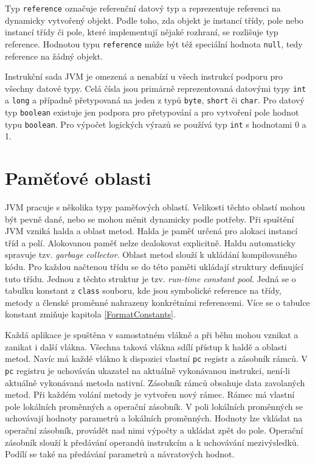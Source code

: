 Typ \texttt{reference} označuje referenční datový typ a reprezentuje referenci na dynamicky vytvořený objekt. Podle toho, zda objekt je instancí třídy, pole nebo instancí třídy či pole, které implementují nějaké rozhraní, se rozlišuje typ reference. Hodnotou typu \texttt{reference} může být též speciální hodnota \texttt{null}, tedy reference na žádný objekt. 





Instrukční sada JVM je omezená a nenabízí u všech instrukcí podporu pro všechny datové typy. Celá čísla jsou primárně reprezentovaná datovými typy \texttt{int} a \texttt{long} a případně přetypovaná na jeden z typů \texttt{byte}, \texttt{short} či \texttt{char}. Pro datový typ \texttt{boolean} existuje jen podpora pro přetypování a pro vytvoření pole hodnot typu \texttt{boolean}. Pro výpočet logických výrazů se používá typ \texttt{int} s hodnotami 0 a 1.


\section{Paměťové oblasti}\label{JVMData}

JVM pracuje s několika typy paměťových oblastí. Velikosti těchto oblastí mohou být pevně dané, nebo se mohou měnit dynamicky podle potřeby. Při spuštění JVM vzniká halda a oblast metod. Halda je paměť určená pro alokaci instancí tříd a polí. Alokovanou paměť nelze dealokovat explicitně. Haldu automaticky spravuje tzv. \textit{garbage collector}. Oblast metod slouží k ukládání kompilovaného kódu. Pro každou načtenou třídu se do této paměti ukládají struktury definující tuto třídu. Jednou z těchto struktur je tzv. \textit{run-time constant pool}. Jedná se o tabulku konstant z \texttt{class} souboru, kde jsou symbolické reference na třídy, metody a členské proměnné nahrazeny konkrétními referencemi. Více se o tabulce konstant zmiňuje kapitola \ref{FormatConstants}. 

Každá aplikace je spuštěna v samostatném vlákně a při běhu mohou vznikat a zanikat i další vlákna. Všechna taková vlákna sdílí přístup k haldě a oblasti metod. Navíc má každé vlákno k dispozici vlastní \texttt{pc} registr a zásobník rámců. V \texttt{pc} registru je uchováván ukazatel na aktuálně vykonávanou instrukci, není-li aktuálně vykonávaná metoda nativní. Zásobník rámců obsahuje data zavolaných metod. Při každém volání metody je vytvořen nový rámec. Rámec má vlastní pole lokálních proměnných a operační zásobník. V poli lokálních proměnných se uchovávají hodnoty parametrů a lokálních proměnných. Hodnoty lze vkládat na operační zásobník, provádět nad nimi výpočty a ukládat zpět do pole. Operační zásobník slouží k předávání operandů instrukcím a k uchovávání mezivýsledků. Podílí se také na předávání parametrů a návratových hodnot.

